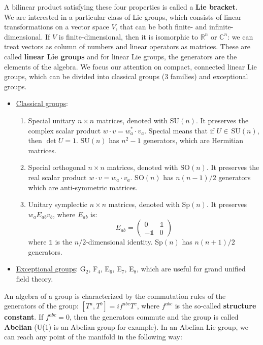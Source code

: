 \documentclass[../main.tex]{subfiles}
\begin{document}
A bilinear product satisfying these four properties is called a \textbf{Lie bracket}.\\
We are interested in a particular class of Lie groups, which consists of linear transformations on a vector space $V$, that can be both finite- and infinite-dimensional. If $V$ is finite-dimensional, then it is isomorphic to $\mathbb{R}^n$ or $\mathbb{C}^n$: we can treat vectors as column of numbers and linear operators as matrices. These are called \textbf{linear Lie groups} and for linear Lie groups, the generators are the elements of the algebra. We focus our attention on compact, connected linear Lie groups, which can be divided into classical groups (3 families) and exceptional groups.
\begin{itemize}
    \item \underline{Classical groups}:
    \begin{enumerate}
        \item Special unitary $n\times n$ matrices, denoted with SU$(n)$. It preserves the complex scalar product $w\cdot v=w_a^*\cdot v_a$. Special means that if $U\in$\,SU$(n)$, then $\det U=1$. SU$(n)$ has $n^2-1$ generators, which are Hermitian matrices.
        \item Special orthogonal $n\times n$ matrices, denoted with SO$(n)$. It preserves the real scalar product $w\cdot v=w_a\cdot v_a$. SO$(n)$ has $n(n-1)/2$ generators which are anti-symmetric matrices.
        \item Unitary symplectic $n\times n$ matrices, denoted with Sp$(n)$. It preserves $w_a E_{ab}v_b$, where $E_{ab}$ is:
        \[
        E_{ab}=\left(\begin{array}{cc}
            0 & \mathbb{1} \\
            -\mathbb{1} & 0
        \end{array}\right)
        \]
        where $\mathbb{1}$ is the $n/2$-dimensional identity. Sp$(n)$ has $n(n+1)/2$ generators.
    \end{enumerate}
    \item\underline{Exceptional groups}: G$_2$, F$_4$, E$_6$, E$_7$, E$_8$, which are useful for grand unified field theory.
\end{itemize}
An algebra of a group is characterized by the commutation rules of the generators of the group: $[T^a,T^b]=if^{abc}T^c$, where $f^{abc}$ is the so-called \textbf{structure constant}. If $f^{abc}=0$, then the generators commute and the group is called \textbf{Abelian} (U(1) is an Abelian group for example). In an Abelian Lie group, we can reach any point of the manifold in the following way:
\end{document}
